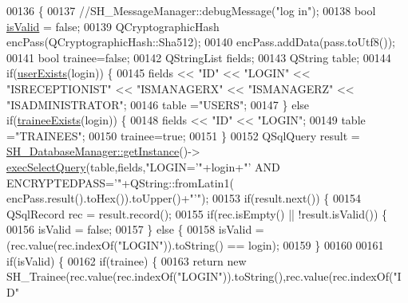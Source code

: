 \begin{DoxyCode}
00136 \{
00137    \textcolor{comment}{//SH\_MessageManager::debugMessage("log in");}
00138     \textcolor{keywordtype}{bool} \hyperlink{classSimpleHotel_1_1SH__User_a8b60e67bc474ee97367f36d0278721ca}{isValid} = \textcolor{keyword}{false};
00139     QCryptographicHash encPass(QCryptographicHash::Sha512);
00140     encPass.addData(pass.toUtf8());
00141     \textcolor{keywordtype}{bool} trainee=\textcolor{keyword}{false};
00142     QStringList fields;
00143     QString table;
00144     \textcolor{keywordflow}{if}(\hyperlink{classSimpleHotel_1_1SH__User_ade0c6b106701dd94e78a0cbf116c926d}{userExists}(login)) \{
00145         fields << \textcolor{stringliteral}{"ID"} << \textcolor{stringliteral}{"LOGIN"} << \textcolor{stringliteral}{"ISRECEPTIONIST"} << \textcolor{stringliteral}{"ISMANAGERX"} << \textcolor{stringliteral}{"ISMANAGERZ"} << \textcolor{stringliteral}{"ISADMINISTRATOR"};
00146         table =\textcolor{stringliteral}{"USERS"};
00147     \} \textcolor{keywordflow}{else} \textcolor{keywordflow}{if}(\hyperlink{classSimpleHotel_1_1SH__User_a502467b4e5fbe99a7bb0b07f4eb1cee0}{traineeExists}(login)) \{
00148         fields << \textcolor{stringliteral}{"ID"} << \textcolor{stringliteral}{"LOGIN"};
00149         table =\textcolor{stringliteral}{"TRAINEES"};
00150         trainee=\textcolor{keyword}{true};
00151     \}
00152     QSqlQuery result = \hyperlink{classSimpleHotel_1_1SH__DatabaseManager_a0bcee98b94b5144e4c066000c4ae3321}{SH\_DatabaseManager::getInstance}()->
      \hyperlink{classSimpleHotel_1_1SH__DatabaseManager_ade052bd4f0e6aa490becef78ce4ea4d7}{execSelectQuery}(table,fields,\textcolor{stringliteral}{"LOGIN='"}+login+\textcolor{stringliteral}{"' AND ENCRYPTEDPASS='"}+QString::fromLatin1(
      encPass.result().toHex()).toUpper()+\textcolor{stringliteral}{"'"});
00153     \textcolor{keywordflow}{if}(result.next()) \{
00154         QSqlRecord rec = result.record();
00155         \textcolor{keywordflow}{if}(rec.isEmpty() || !result.isValid()) \{
00156             isValid = \textcolor{keyword}{false};
00157         \} \textcolor{keywordflow}{else} \{
00158             isValid = (rec.value(rec.indexOf(\textcolor{stringliteral}{"LOGIN"})).toString() == login);
00159         \}
00160 
00161         \textcolor{keywordflow}{if}(isValid) \{
00162             \textcolor{keywordflow}{if}(trainee) \{
00163                 \textcolor{keywordflow}{return} \textcolor{keyword}{new} SH\_Trainee(rec.value(rec.indexOf(\textcolor{stringliteral}{"LOGIN"})).toString(),rec.value(rec.indexOf(\textcolor{stringliteral}{"ID"}

\end{DoxyCode}
